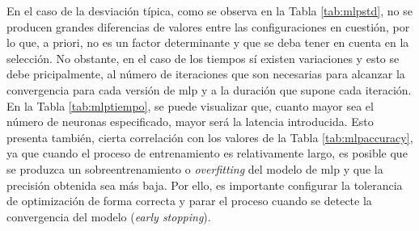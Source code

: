 \vspace{3mm}

En el caso de la desviación típica, como se observa en la Tabla \ref{tab:mlpstd}, no se producen grandes diferencias de valores entre las configuraciones en cuestión, por lo que, a priori, no es un factor determinante y que se deba tener en cuenta en la selección. No obstante, en el caso de los tiempos sí existen variaciones y esto se debe pricipalmente, al número de iteraciones que son necesarias para alcanzar la convergencia para cada versión de \gls{mlp} y a la duración que supone cada iteración. En la Tabla \ref{tab:mlptiempo}, se puede visualizar que, cuanto mayor sea el número de neuronas especificado, mayor será la latencia introducida. Esto presenta también, cierta correlación con los valores de la Tabla \ref{tab:mlpaccuracy}, ya que cuando el proceso de entrenamiento es relativamente largo, es posible que se produzca un sobreentrenamiento o \textit{overfitting} del modelo de \gls{mlp} y que la precisión obtenida sea más baja. Por ello, es importante configurar la tolerancia de optimización de forma correcta y parar el proceso cuando se detecte la convergencia del modelo (\textit{early stopping}).

\vspace{3mm}

